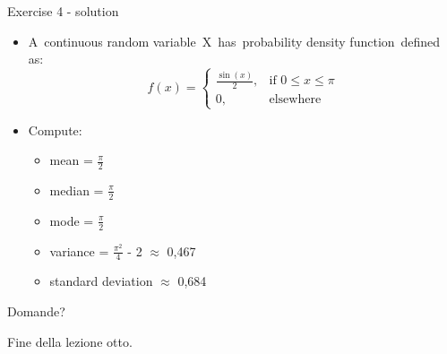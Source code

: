 \documentclass{beamer}
\begin{document}
\begin{frame}
{\centerline{Exercise 4 - solution}}
\begin{itemize}
    \item A continuous random variable X has probability density function defined as:
    \begin{equation*}
        
  f(x)=\left\{
        \begin{array}{ll}
             \frac{\sin(x)}{2}, & \mbox{if $0 \leq x \leq \pi$}\\
                0, & \mbox{elsewhere}
         \end{array}
        \right.
    \end{equation*}
    \newline
    \item Compute:
    \begin{itemize}
        \item mean = $\frac{\pi}{2}$
        \item median = $\frac{\pi}{2}$
        \item mode = $\frac{\pi}{2}$
        \item variance  = $\frac{\pi^{2}}{4}$ - 2 $\approx$ 0,467
        \item standard deviation $\approx$ 0,684
    \end{itemize}
\end{itemize}
\end{frame}


\begin{frame}
{\centerline{Domande?}}
\vspace{1cm}
\begin{center}
    \LARGE{Fine della lezione otto.}
\end{center}

\end{frame}
\end{document}
